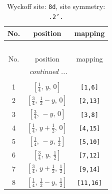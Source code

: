 \documentclass[fleqn,8pt]{jsarticle}
\begin{document}
\begin{longtable}{ccc}
\caption{Wyckoff site: {\tt 8d}, site symmetry: {\tt .2'.}}
 \\
 \hline \hline
No. & position & mapping \\ \hline \endfirsthead

\multicolumn{2}{l}{\tablename\ \thetable{}} \\
 \hline \hline
No. & position & mapping \\ \hline \endhead

 \hline \hline
\multicolumn{2}{r}{\footnotesize\it continued ...} \\ \endfoot

 \hline \hline
\multicolumn{2}{r}{} \\ \endlastfoot

1 & $\left[ \frac{1}{4},\, y,\, 0 \right]$ & {\tt [1,6]} \\ \hline
2 & $\left[ \frac{3}{4},\, \frac{1}{2} - y,\, 0 \right]$ & {\tt [2,13]} \\ \hline
3 & $\left[ \frac{3}{4},\, - y,\, 0 \right]$ & {\tt [3,8]} \\ \hline
4 & $\left[ \frac{1}{4},\, y + \frac{1}{2},\, 0 \right]$ & {\tt [4,15]} \\ \hline
5 & $\left[ \frac{1}{4},\, - y,\, \frac{1}{2} \right]$ & {\tt [5,10]} \\ \hline
6 & $\left[ \frac{3}{4},\, y,\, \frac{1}{2} \right]$ & {\tt [7,12]} \\ \hline
7 & $\left[ \frac{3}{4},\, y + \frac{1}{2},\, \frac{1}{2} \right]$ & {\tt [9,14]} \\ \hline
8 & $\left[ \frac{1}{4},\, \frac{1}{2} - y,\, \frac{1}{2} \right]$ & {\tt [11,16]} \\
\end{longtable}
\renewcommand{\arraystretch}{1.2}
\end{document}
